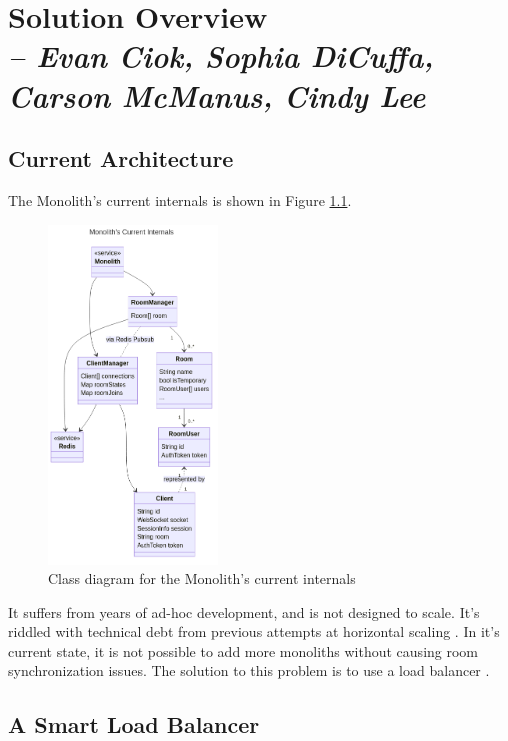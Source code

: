 \chapter{Solution Overview \\
  \small{\textit{-- Evan Ciok, Sophia DiCuffa, Carson McManus, Cindy Lee}}
  \label{Chapter::SolutionOverview}}

\section{Current Architecture}

The Monolith's  current internals is shown in Figure \ref{Figure::monolith-class-current}.

\begin{figure}[!h]
  \centering
  \includegraphics[width=0.4\textwidth]{Figures/monolith-class-current.png}
  \caption{Class diagram for the Monolith's current internals}
  \label{Figure::monolith-class-current}
\end{figure}

It suffers from years of ad-hoc development, and is not designed to scale. It's riddled with technical debt from previous attempts at horizontal scaling . In it's current state, it is not possible to add more monoliths without causing room synchronization issues. The solution to this problem is to use a load balancer .

\section{A Smart Load Balancer}


